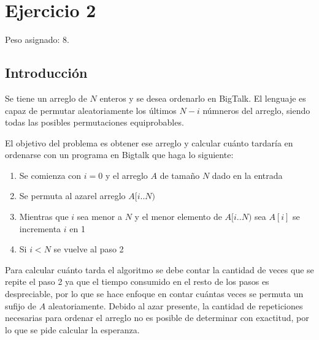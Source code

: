 \section{Ejercicio 2}

Peso asignado: 8.

\subsection{Introducción}

Se tiene un arreglo de $N$ enteros y se desea ordenarlo en BigTalk. El
lenguaje es capaz de permutar aleatoriamente los últimos $N - i$ númneros del
arreglo, siendo todas las posibles permutaciones equiprobables.

El objetivo del problema es obtener ese arreglo y calcular cuánto tardaría en
ordenarse con un programa en Bigtalk que haga lo siguiente:

\begin{enumerate}
\item Se comienza con $i = 0$ y el arreglo $A$ de tamaño $N$ dado en la
entrada
\item Se permuta al azarel arreglo $A[i..N)$
\item Mientras que $i$ sea menor a $N$ y el menor elemento de $A[i..N)$ sea
$A[i]$ se incrementa $i$ en 1
\item Si $i < N$ se vuelve al paso 2
\end{enumerate}

Para calcular cuánto tarda el algoritmo se debe contar la cantidad de veces
que se repite el paso 2 ya que el tiempo consumido en el resto de los pasos es
despreciable, por lo que se hace enfoque en contar cuántas veces se permuta un
sufijo de $A$ aleatoriamente. Debido al azar presente, la cantidad de
repeticiones necesarias para ordenar el arreglo no es posible de determinar
con exactitud, por lo que se pide calcular la esperanza.